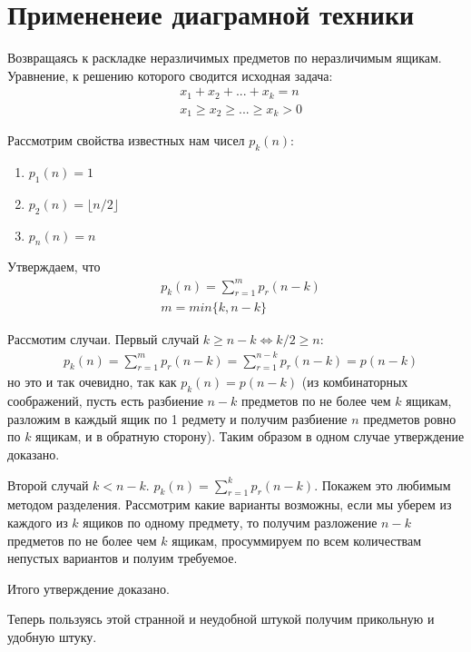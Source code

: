 \chapter{Примененеие диаграмной техники}

Возвращаясь к раскладке неразличимых предметов по неразличимым ящикам. Уравнение, к решению которого сводится исходная задача:
\[
	\begin{split}
		& x_1 + x_2 + ... + x_k = n \\
		& x_1 \ge x_2 \ge ... \ge x_k > 0
	\end{split}
\]

Рассмотрим свойства известных нам чисел $p_k\left(n\right)$:
\begin{enumerate}
\item $p_1\left(n\right) = 1$

\item $p_2\left(n\right) = \lfloor n/2\rfloor$

\item $p_n\left(n\right) = n$
\end{enumerate}

Утверждаем, что 
\[
	\begin{split}
		&p_k\left(n\right) = \sum_{r=1}^{m} p_r\left(n-k\right)\\
		&m = min\{k, n-k\}
	\end{split}
\]

Рассмотим случаи. Первый случай $k\ge n-k \Leftrightarrow k/2 \ge n$:
\[
	\begin{split}
		&p_k\left(n\right) = \sum_{r=1}^{m} p_r\left(n-k\right) = \sum_{r=1}^{n-k} p_r\left(n-k\right) = p\left(n-k\right)
	\end{split}
\]
но это и так очевидно, так как $p_k\left(n\right) = p\left(n-k\right)$ (из комбинаторных соображений, пусть есть разбиение $n-k$ предметов по не более чем $k$ ящикам, разложим в каждый ящик по 1 редмету и получим разбиение $n$ предметов ровно по $k$ ящикам, и в обратную сторону). Таким образом в одном случае утверждение доказано.

Второй случай $k < n-k$. $p_k\left(n\right) = \sum_{r=1}^{k} p_r\left(n-k\right)$. Покажем это любимым методом разделения. Рассмотрим какие варианты возможны, если мы уберем из каждого из $k$ ящиков по одному предмету, то получим разложение $n-k$ предметов по не более чем $k$ ящикам, просуммируем по всем количествам непустых вариантов и полуим требуемое.

Итого утверждение доказано.

Теперь пользуясь этой странной и неудобной штукой получим прикольную и удобную штуку.

